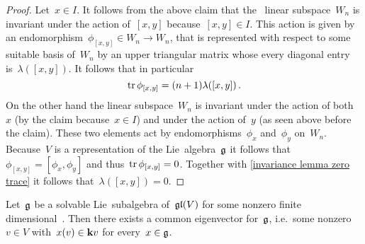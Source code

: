 \begin{proof}
  Let~$x \in I$.
  It follows from the above claim that the~{} linear subspace~$W_n$ is invariant under the action of~$[x,y]$ because~$[x,y] \in I$.
  This action is given by an endomorphism~$\phi_{[x,y]} \in W_n \to W_n$, that is represented with respect to some suitable basis of~$W_n$ by an upper triangular matrix whose every diagonal entry is~$\lambda([x,y])$.
  It follows that in particular
  \begin{equation}
    \label{invariance lemma zero trace}
    \operatorname{tr} \phi_{[x,y]}
    =
    (n+1) \lambda([x,y])  \,.
  \end{equation}
  On the other hand the linear subspace~$W_n$ is invariant under the action of both~$x$ (by the claim because~$x \in I$) and under the action of~$y$ (as seen above before the claim).
  These two elements act by endomorphisms~$\phi_x$ and~$\phi_y$ on~$W_n$.
  Because~$V$ is a representation of the Lie~algebra~$\mathfrak{g}$ it follows that~$\phi_{[x,y]} = [\phi_x, \phi_y]$ and thus~$\operatorname{tr} \phi_{[x,y]} = 0$.
  Together with \eqref{invariance lemma zero trace} it follows that~$\lambda([x,y]) = 0$.
\end{proof}


\begin{theorem}[Lie]
  Let~$\mathfrak{g}$ be a solvable Lie~subalgebra of~$\mathfrak{gl}(V)$ for some nonzero finite dimensional~{\vectorspace{$\kf$}}. Then there exists a common eigenvector for~$\mathfrak{g}$, i.e.\ some nonzero~$v \in V$ with~$x(v) \in \mathbf{k} v$ for every~$x \in \mathfrak{g}$.
\end{theorem}


